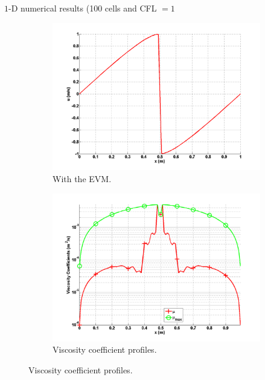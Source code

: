 \documentclass[xcolor=dvipsnames,10pt]{beamer}
\begin{document}
\begin{frame}{$1$-D numerical results (100 cells and CFL $=1$}
\begin{figure}[H]
        \begin{subfigure}[b]{0.37\textwidth}
                \centering
                \includegraphics[width=\textwidth]{../figures/1D_sol_ev.png}
                \caption{With the EVM.}
                \label{fig:1d_burger_ev}
        \end{subfigure}
        \begin{subfigure}[b]{0.37\textwidth}
                \centering
                \includegraphics[width=\textwidth]{../figures/1D_visc.png}
                \caption{Viscosity coefficient profiles.}
                \label{fig:1d_burger_visc}
        \end{subfigure}
\end{figure}
\end{frame}
\end{document}
